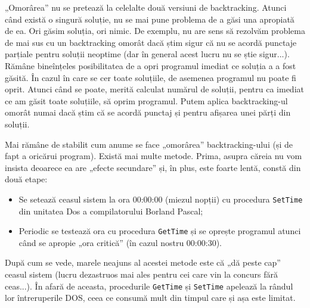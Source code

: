 „Omorârea” nu se pretează la celelalte două versiuni de backtracking. Atunci
când există o singură soluție, nu se mai pune problema de a găsi una apropiată
de ea. Ori găsim soluția, ori nimic. De exemplu, nu are sens să rezolvăm
problema de mai sus cu un backtracking omorât dacă știm sigur că nu se acordă
punctaje parțiale pentru soluții neoptime (dar în general acest lucru nu se
știe sigur...). Rămâne bineînțeles posibilitatea de a opri programul imediat
ce soluția a a fost găsită. În cazul în care se cer toate soluțiile, de
asemenea programul nu poate fi oprit. Atunci când se poate, merită calculat
numărul de soluții, pentru ca imediat ce am găsit toate soluțiile, să oprim
programul. Putem aplica backtracking-ul omorât numai dacă știm că se acordă
punctaj și pentru afișarea unei părți din soluții.

Mai rămâne de stabilit cum anume se face „omorârea” backtracking-ului (și de
fapt a oricărui program). Există mai multe metode. Prima, asupra căreia nu vom
insista deoarece ea are „efecte secundare” și, în plus, este foarte lentă,
constă din două etape:

\begin{itemize}

\item Se setează ceasul sistem la ora 00:00:00 (miezul nopții) cu procedura
  {\tt SetTime} din unitatea Dos a compilatorului Borland Pascal;

\item Periodic se testează ora cu procedura {\tt GetTime} și se oprește
  programul atunci când se apropie „ora critică” (în cazul nostru 00:00:30).

\end{itemize}

După cum se vede, marele neajuns al acestei metode este că „dă peste cap”
ceasul sistem (lucru dezastruos mai ales pentru cei care vin la concurs fără
ceas...). În afară de aceasta, procedurile {\tt GetTime} și {\tt SetTime}
apelează la rândul lor întreruperile DOS, ceea ce consumă mult din timpul care
și așa este limitat.

